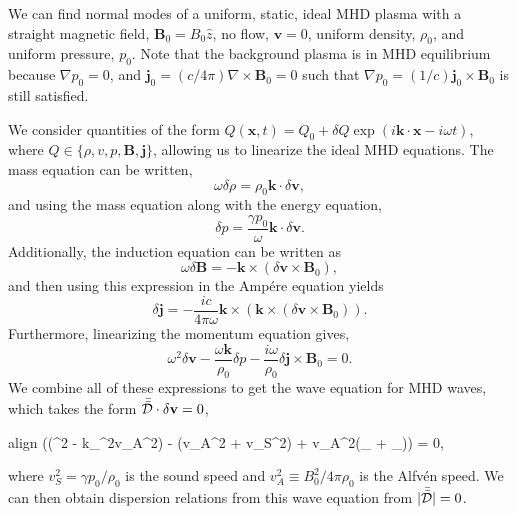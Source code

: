 	We can find normal modes of a uniform, static, ideal MHD plasma with a straight magnetic field, $\mathbf{B}_0=B_0\hat{z}$, no flow, $\mathbf{v}=0$, uniform density, $\rho_0$, and uniform pressure, $p_0$. Note that the background plasma is in MHD equilibrium because $\nabla p_0=0$, and $\mathbf{j}_0=(c/4\pi)\nabla\times\mathbf{B}_0=0$ such that $\nabla p_0=(1/c)\mathbf{j}_0\times\mathbf{B}_0$ is still satisfied.

	We consider quantities of the form $Q(\mathbf{x},t) = Q_0 + \delta Q\exp{(i\mathbf{k}\cdot\mathbf{x} - i\omega t)}$, where $Q\in\{\rho,v,p,\mathbf{B},\mathbf{j}\}$, allowing us to linearize the ideal MHD equations. The mass equation can be written,
	\begin{equation}
		\omega\delta\rho = \rho_0\mathbf{k}\cdot\delta\mathbf{v},
	\end{equation}
	and using the mass equation along with the energy equation,
	\begin{equation}
		\delta p = \frac{\gamma p_0}{\omega}\mathbf{k}\cdot\delta\mathbf{v}.
	\end{equation}
	Additionally, the induction equation can be written as
	\begin{equation}
		\omega\delta\mathbf{B} = -\mathbf{k}\times(\delta\mathbf{v}\times\mathbf{B}_0),
	\end{equation}
	and then using this expression in the Amp\'ere equation yields 
	\begin{equation}
		\delta\mathbf{j} = -\frac{ic}{4\pi\omega}\mathbf{k}\times(\mathbf{k}\times(\delta\mathbf{v}\times\mathbf{B}_0)).
	\end{equation}
	Furthermore, linearizing the momentum equation gives,
	\begin{equation}
		\omega^2\delta\mathbf{v} - \frac{\omega\mathbf{k}}{\rho_0}\delta p - \frac{i\omega}{\rho_0}\delta\mathbf{j}\times\mathbf{B}_0 = 0.
	\end{equation}
	We combine all of these expressions to get the wave equation for MHD waves, which takes the form $\bar{\bar{\mathcal{D}}}\cdot\delta\mathbf{v} = 0$,
	\begin{empheq}[box=\widefbox]{align}
		((\omega^2 - k_{\parallel}^2v_A^2) - (v_A^2 + v_S^2)\mathbf{k} + v_A^2(\mathbf{k}_{\parallel} + _{\parallel}))\cdot\delta{} = 0,
	\end{empheq}
	where $v_S^2 = \gamma p_0/\rho_0$ is the sound speed and $v_A^2\equiv B_0^2/4\pi\rho_0$ is the Alfv\'en speed. We can then obtain dispersion relations from this wave equation from $|\bar{\bar{\mathcal{D}}}|=0$.

